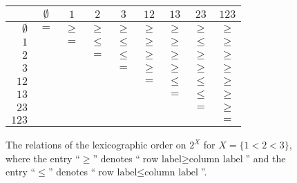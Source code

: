 \documentclass[oneside]{amsart}
\theoremstyle{definition}
\begin{document}
\begin{figure}
    \centering
    \begin{tabular}{r|cccccccc}
                    & $\emptyset$ & $1$    & $2$    & $3$    & $12$   & $13$   & $23$   & $123$  \\ \hline
        $\emptyset$ & $=$         & $\geq$ & $\geq$ & $\geq$ & $\geq$ & $\geq$ & $\geq$ & $\geq$ \\
        $1$         &             & $=$    & $\leq$ & $\leq$ & $\geq$ & $\geq$ & $\leq$ & $\geq$ \\
        $2$         &             &        & $=$    & $\leq$ & $\geq$ & $\geq$ & $\geq$ & $\geq$ \\
        $3$         &             &        &        & $=$    & $\geq$ & $\geq$ & $\geq$ & $\geq$ \\
        $12$        &             &        &        &        & $=$    & $\leq$ & $\leq$ & $\geq$ \\
        $13$        &             &        &        &        &        & $=$    & $\leq$ & $\geq$ \\
        $23$        &             &        &        &        &        &        & $=$    & $\geq$ \\
        $123$       &             &        &        &        &        &        &        & $=$
    \end{tabular}

    \caption{The relations of the lexicographic order on $2^X$ for $X = \{ 1 < 2 < 3 \}$, where the entry \enquote{$\geq$} denotes \enquote{$\text{row label} \geq \text{column label}$} and the entry \enquote{$\leq$} denotes \enquote{$\text{row label} \leq \text{column label}$}.}
    \label{figure:123LexOrder}
\end{figure}
\end{document}
